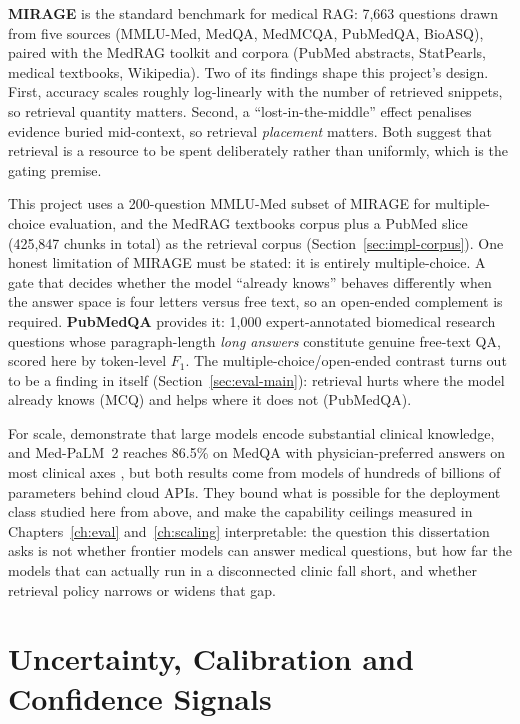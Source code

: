 \textbf{MIRAGE} \citep{mirage2024} is the standard benchmark for medical RAG:
7,663 questions drawn from five sources (MMLU-Med, MedQA, MedMCQA, PubMedQA,
BioASQ), paired with the MedRAG toolkit and corpora (PubMed abstracts,
StatPearls, medical textbooks, Wikipedia). Two of its findings shape this
project's design. First, accuracy scales roughly log-linearly with the number
of retrieved snippets, so retrieval quantity matters. Second, a
``lost-in-the-middle'' effect penalises evidence buried mid-context, so
retrieval \emph{placement} matters. Both suggest that retrieval is a resource
to be spent deliberately rather than uniformly, which is the gating premise.

This project uses a 200-question MMLU-Med subset of MIRAGE for
multiple-choice evaluation, and the MedRAG textbooks corpus plus a PubMed
slice (425,847 chunks in total) as the retrieval corpus
(Section~\ref{sec:impl-corpus}). One honest limitation of MIRAGE must be
stated: it is entirely multiple-choice. A gate that decides whether the model
``already knows'' behaves differently when the answer space is four letters
versus free text, so an open-ended complement is required.
\textbf{PubMedQA} \citep{jin2019pubmedqa} provides it: 1,000
expert-annotated biomedical research questions whose paragraph-length
\emph{long answers} constitute genuine free-text QA, scored here by
token-level $F_1$. The multiple-choice/open-ended contrast turns out to be a
finding in itself (Section~\ref{sec:eval-main}): retrieval hurts where the
model already knows (MCQ) and helps where it does not (PubMedQA).

For scale, \citet{singhal2023medpalm} demonstrate that large models encode
substantial clinical knowledge, and Med-PaLM~2 reaches 86.5\% on MedQA with
physician-preferred answers on most clinical axes
\citep{singhal2025medpalm2}, but both results come from models of
hundreds of billions of parameters behind cloud APIs. They bound what is
possible for the deployment class studied here from above, and make the
capability ceilings measured in Chapters~\ref{ch:eval}
and~\ref{ch:scaling} interpretable: the question this dissertation asks is
not whether frontier models can answer medical questions, but how far the
models that can actually run in a disconnected clinic fall short, and
whether retrieval policy narrows or widens that gap.

\section{Uncertainty, Calibration and Confidence Signals}
\label{sec:bg-calibration}

